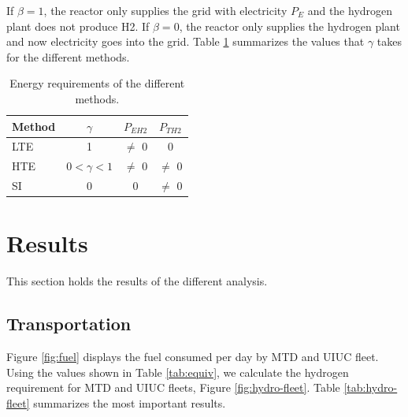 \documentclass[11pt,letterpaper]{article}
\begin{document}
If $\beta = 1$, the reactor only supplies the grid with electricity $P_E$ and the hydrogen plant does not produce \gls{H2}.
If $\beta = 0$, the reactor only supplies the hydrogen plant and now electricity goes into the grid.
Table \ref{tab:cogen1} summarizes the values that $\gamma$ takes for the different methods.

\begin{table}[htbp!]
    \centering
    \begin{tabular}{|lccc|}
        \hline
        Method    & $\gamma$         & $P_{EH2}$ & $P_{TH2}$ \\ \hline
        \gls{LTE} & 1                & $\ne$ 0   & 0         \\
        \gls{HTE} & $0 < \gamma < 1$ & $\ne$ 0   & $\ne$ 0   \\
        \gls{SI}  & 0                & 0         & $\ne$ 0   \\ \hline
    \end{tabular}
    \caption{Energy requirements of the different methods.}
    \label{tab:cogen1}
\end{table}

\section{Results}
\label{sec:Results}

This section holds the results of the different analysis.

\subsection{Transportation}

Figure \ref{fig:fuel} displays the fuel consumed per day by \gls{MTD} and \gls{UIUC} fleet.
Using the values shown in Table \ref{tab:equiv}, we calculate the hydrogen requirement for MTD and UIUC fleets, Figure \ref{fig:hydro-fleet}.
Table \ref{tab:hydro-fleet} summarizes the most important results.
\end{document}
